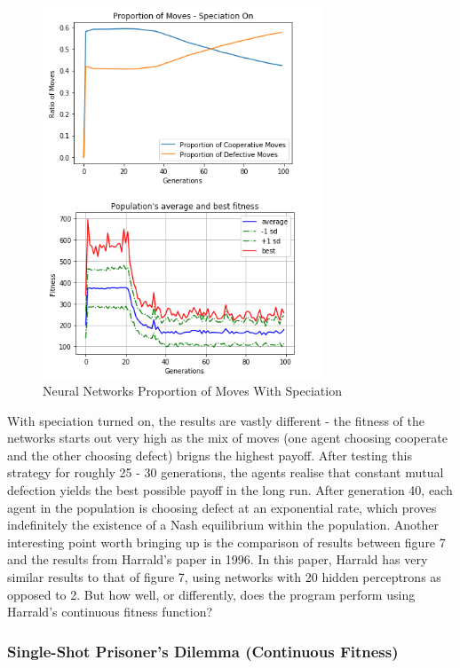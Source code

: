 \documentclass[12pt,a4paper]{article}
\begin{document}
\begin{figure}[H]
	\centering
		\includegraphics[width=0.75\textwidth]{RatioSpeciationOn}
		\caption{Neural Networks Proportion of Moves With Speciation}
\end{figure}

With speciation turned on, the results are vastly different - the fitness of the networks starts out very high as the mix of moves (one agent choosing cooperate and the other choosing defect) brigns the highest payoff. After testing this strategy for roughly 25 - 30 generations, the agents realise that constant mutual defection yields the best possible payoff in the long run. After generation 40, each agent in the population is choosing defect at an exponential rate, which proves indefinitely the existence of a Nash equilibrium within the population. Another interesting point worth bringing up is the comparison of results between figure 7 and the results from Harrald's\cite{25} paper in 1996. In this paper, Harrald has very similar results to that of figure 7, using networks with 20 hidden perceptrons as opposed to 2. But how well, or differently, does the program perform using Harrald's continuous fitness function?

\subsubsection{Single-Shot Prisoner's Dilemma (Continuous Fitness)}
\end{document}
